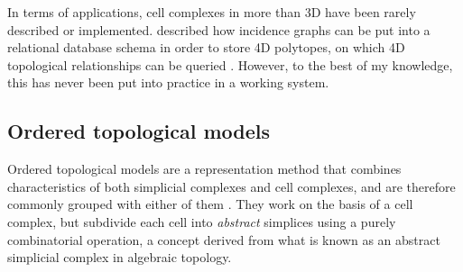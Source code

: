 In terms of applications, cell complexes in more than 3D have been rarely described or implemented.
\citet{Hazelton90} described how incidence graphs can be put into a relational database schema in order to store 4D polytopes, on which 4D topological relationships can be queried \citep{Hazelton92}.
However, to the best of my knowledge, this has never been put into practice in a working system.

\subsection{Ordered topological models}
\label{ss:ordered-topological-models}

Ordered topological models are a representation method that combines characteristics of both simplicial complexes and cell complexes, and are therefore commonly grouped with either of them \citep{deFloriani05,Comic12}.
They work on the basis of a cell complex, but subdivide each cell into \emph{abstract} simplices using a purely combinatorial operation, a concept derived from what is known as an abstract simplicial complex in algebraic topology.

